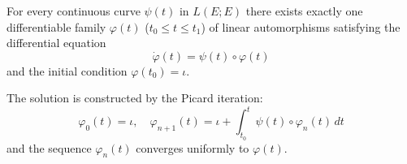 For every continuous curve $\psi(t)$ in $L(E; E)$ there exists exactly one differentiable family $\varphi(t)$ ($t_0 \leq t \leq t_1$) of linear automorphisms satisfying the differential equation
$$\dot{\varphi}(t) = \psi(t) \circ \varphi(t)$$
and the initial condition $\varphi(t_0) = \iota$.

The solution is constructed by the Picard iteration:
$$\varphi_0(t) = \iota, \quad \varphi_{n+1}(t) = \iota + \int_{t_0}^{t} \psi(t) \circ \varphi_n(t) \, dt$$
and the sequence $\varphi_n(t)$ converges uniformly to $\varphi(t)$.
